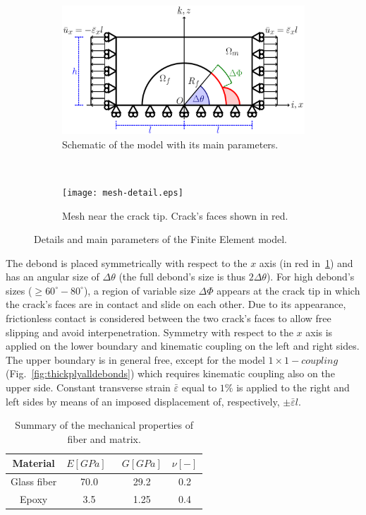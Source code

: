 \documentclass[review]{elsarticle}
\begin{document}
\begin{figure}[!h]
\centering
    \begin{subfigure}[b]{0.55\textwidth}
        \includegraphics[width=\textwidth]{RUC.pdf}
        \caption{Schematic of the model with its main parameters.}\label{subfig:modelschem}
    \end{subfigure} ~
    \begin{subfigure}[b]{0.4\textwidth}
        \texttt{[image: mesh-detail.eps]}
        \caption{Mesh near the crack tip. Crack's faces shown in red.}\label{subfig:meshdetail}
    \end{subfigure}

\caption{Details and main parameters of the Finite Element model.}\label{fig:FEmodel}
\end{figure}

The debond is placed symmetrically with respect to the $x$ axis (in red in~\ref{subfig:modelschem}) and has an angular size of $\Delta\theta$ (the full debond's size is thus $2\Delta\theta$). For high debond's sizes ($\geq 60^{\circ}-80^{\circ}$), a region of variable size $\Delta\Phi$ appears at the crack tip in which the crack's faces are in contact and slide on each other. Due to its appearance, frictionless contact is considered between the two crack's faces to allow free slipping and avoid interpenetration. Symmetry with respect to the $x$ axis is applied on the lower boundary and kinematic coupling on the left and right sides. The upper boundary is in general free, except for the model $1\times 1-coupling$ (Fig.~\ref{fig:thickplyalldebonds}) which requires kinematic coupling also on the upper side. Constant transverse strain $\bar{\varepsilon}$ equal to $1\%$ is applied to the right and left sides by means of an imposed displacement of, respectively, $\pm\bar{\varepsilon}l$.

\begin{table}[!htbp]
 \centering
 \caption{Summary of the mechanical properties of fiber and matrix.}
 \begin{tabular}{cccc}
\textbf{Material} & \textbf{$E\left[GPa\right]$}\ & \textbf{$G\left[GPa\right]$} & \textbf{$\nu\left[-\right]$} \\
\midrule
Glass fiber    & 70.0  & 29.2   & 0.2  \\
Epoxy    & 3.5    & 1.25   & 0.4  
\end{tabular}
\label{tab:phaseprop}
\end{table}
\end{document}
